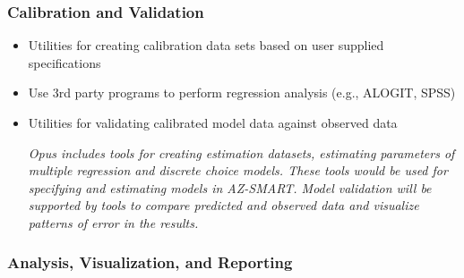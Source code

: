 \documentclass[titlepage]{article}
\begin{document}
\subsubsection{Calibration and Validation}

\begin{itemize}

\item Utilities for creating calibration data sets based on user supplied specifications
\item Use 3rd party programs to perform regression analysis (e.g., ALOGIT, SPSS)
\item Utilities for validating calibrated model data against observed data

\emph{Opus includes tools for creating estimation datasets, estimating parameters of multiple regression and discrete choice models.  These tools would be used for specifying and estimating models in AZ-SMART.  Model validation will be supported by tools to compare predicted and observed data and visualize patterns of error in the results.}

\end{itemize}

\subsubsection{Analysis, Visualization, and Reporting}
\end{document}
